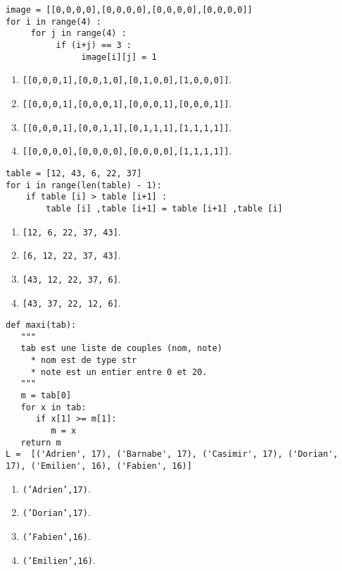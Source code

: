 \begin{lstlisting}
image = [[0,0,0,0],[0,0,0,0],[0,0,0,0],[0,0,0,0]]
for i in range(4) :
     for j in range(4) :
          if (i+j) == 3 :
               image[i][j] = 1
\end{lstlisting}
\begin{enumerate}
\item \texttt{[[0,0,0,1],[0,0,1,0],[0,1,0,0],[1,0,0,0]]}. %
\item \texttt{[[0,0,0,1],[0,0,0,1],[0,0,0,1],[0,0,0,1]]}.
\item \texttt{[[0,0,0,1],[0,0,1,1],[0,1,1,1],[1,1,1,1]]}.
\item \texttt{[[0,0,0,0],[0,0,0,0],[0,0,0,0],[1,1,1,1]]}.
\end{enumerate}


\begin{lstlisting}
table = [12, 43, 6, 22, 37]
for i in range(len(table) - 1):
    if table [i] > table [i+1] :
        table [i] ,table [i+1] = table [i+1] ,table [i]
\end{lstlisting}
\begin{enumerate}
\item \texttt{[12, 6, 22, 37, 43]}. %
\item \texttt{[6, 12, 22, 37, 43]}.
\item \texttt{[43, 12, 22, 37, 6]}.
\item \texttt{[43, 37, 22, 12, 6]}.
\end{enumerate}


\begin{lstlisting}
def maxi(tab):
   """
   tab est une liste de couples (nom, note)
     * nom est de type str
     * note est un entier entre 0 et 20.
   """
   m = tab[0]
   for x in tab:
      if x[1] >= m[1]:
         m = x
   return m
L =  [('Adrien', 17), ('Barnabe', 17), ('Casimir', 17), ('Dorian', 17), ('Emilien', 16), ('Fabien', 16)]
\end{lstlisting}
\begin{enumerate}
\item \texttt{('Adrien',17)}.
\item \texttt{('Dorian',17)}. %
\item \texttt{('Fabien',16)}.
\item \texttt{('Emilien',16)}.
\end{enumerate}


